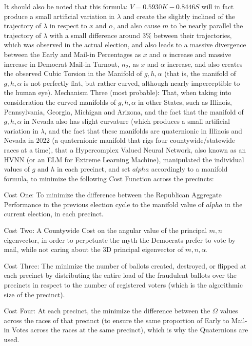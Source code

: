 It should also be noted that this formula: $V=0.5930K-0.8446S$ will in fact produce a small artificial variation in $\lambda$ and create the slightly inclined of the trajectory of $\lambda$ in respect to $x$ and $\alpha$, and also cause $m$ to be nearly parallel the trajectory of $\lambda$ with a small difference around 3\% between their trajectories, which was observed in the actual election, and also leads to a massive divergence between the Early and Mail-in Percentages as $x$ and $\alpha$ increase and massive increase in Democrat Mail-in Turnout, $n_{2}$, as $x$ and $\alpha$ increase, and also creates the observed Cubic Torsion in the Manifold of $g,h,\alpha$ (that is, the manifold of $g,h,\alpha$ is not perfectly flat, but rather curved, although nearly imperceptible to the human eye).
\newpage
Mechanism Three (most probable): That, when taking into consideration the curved manifolds of $g,h,\alpha$ in other States, such as Illinois, Pennsylvania, Georgia, Michigan and Arizona, and the fact that the manifold of $g,h,\alpha$ in Nevada also has slight curvature (which produces a small artificial variation in $\lambda$, and the fact that these manifolds are quaternionic in Illinois and Nevada in 2022 (a quaternionic manifold that rigs four countywide/statewide races at a time), that a Hypercomplex Valued Neural Network, also known as an HVNN (or an ELM for Extreme Learning Machine), manipulated the individual values of $g$ and $h$ in each precinct, and set $alpha$ accordingly to a manifold formula, to minimize the following Cost Function across the precincts:

Cost One: To minimize the difference between the Republican Aggregate Performance in the previous election cycle to the manifold value of $alpha$ in the current election, in each precinct.

Cost Two: A Countywide Cost on the angular value of the principal $m,n$ eigenvector, in order to perpetuate the myth the Democrats prefer to vote by mail, while not caring about the 3D principal eigenvector of $m,n,\alpha$.

Cost Three: The minimize the number of ballots created, destroyed, or flipped at each precinct by distributing the entire load of the fraudulent ballots over the precincts in respect to the number of registered voters (which is the algorithmic size of the precinct).

Cost Four: At each precinct, the minimize the difference between the $\Omega$ values across the races of that precinct (to ensure the same proportion of Early to Mail-in Votes across the races at the same precinct), which is why the Quaternions are used.

